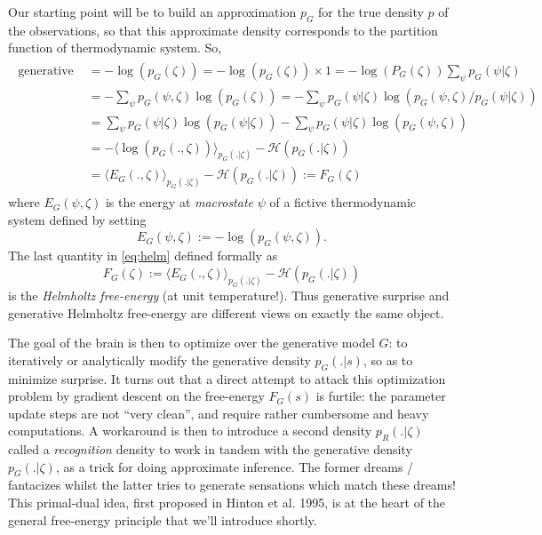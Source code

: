 \documentclass{article} %
\begin{document}
Our starting point will be to build an approximation $p_G$ for the true density $p$ of the observations, so that this approximate density corresponds to the partition function of thermodynamic system. So,
\begin{eqnarray}
  \begin{split}
    \text{generative surprise } &= -\log(p_G(\zeta)) = -\log(p_G(\zeta)) \times 1 = -\log(P_G(\zeta))\sum_{\psi}p_G(\psi |\zeta)\\
    &= -\sum_{\psi}p_G(\psi, \zeta)\log(p_G(\zeta))
    =-\sum_{\psi}p_G(\psi |\zeta)\log(p_G(\psi, \zeta)/p_G(\psi|\zeta))\\
    &= \sum_{\psi}p_G(\psi |\zeta)\log(p_G(\psi|\zeta))-\sum_{\psi}p_G(\psi |\zeta)\log  (p_G(\psi, \zeta))\\
    &= -\langle \log  (p_G(., \zeta)) \rangle_{p_G(. |\zeta)} - \mathcal H(p_G(. |\zeta))\\
    &= \langle E_G(., \zeta) \rangle_{p_G(. |\zeta)} - \mathcal H(p_G(. |\zeta)) := F_G(\zeta)
  \end{split}
  \label{eq:helm}
\end{eqnarray}
where $E_G(\psi, \zeta)$ is the energy at \textit{macrostate} $\psi$ of a fictive thermodynamic system defined by setting
\begin{equation}
  E_G(\psi, \zeta) := -\log(p_G(\psi, \zeta)).
  \label{eq:gibbs}
\end{equation}
The last quantity in \eqref{eq:helm} defined formally as
\begin{equation}
  F_G(\zeta) := \langle E_G(., \zeta) \rangle_{p_G(. |\zeta)} - \mathcal H(p_G(. |\zeta))
\end{equation}
is the \textit{Helmholtz free-energy} (at unit temperature!). %
Thus generative surprise and generative Helmholtz free-energy are different views on exactly the same object.

The goal of the brain is then to optimize over the generative model $G$: to iteratively or analytically modify the generative density $p_G(.|s)$, so as to minimize surprise. It turns out that a direct attempt to attack this optimization problem by gradient descent on the free-energy $F_G(s)$ is furtile: the parameter update steps are not ``very clean'', and require rather cumbersome and heavy computations. A workaround is then to introduce a second density $p_R(.|\zeta)$ called a \textit{recognition} density to work in tandem with the generative density $p_G(.|\zeta)$, as a trick for doing approximate inference. The former dreams / fantacizes whilst the latter tries to generate sensations which match these dreams! This primal-dual idea, first proposed in Hinton et al. 1995, is at the heart of the general free-energy principle that we'll introduce shortly.
\end{document}
